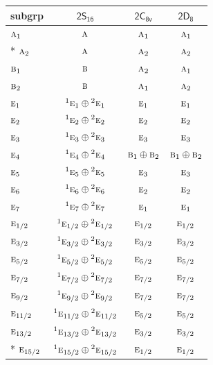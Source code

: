 \documentclass[10pt,a4paper]{article}
\numberwithin{equation}{section}
\newcommand{\grp}[1]{\mathsf{#1}}
\newcommand{\irr}[1]{\text{\normalfont\scshape #1}}
\newcommand{\conjpair}[1]{{}^{#1}}
\begin{document}
{\small\begin{longtable}{@{}lccc@{}}\toprule
subgrp & \href{2S16.pdf}{$\grp{2S_{16}}$} & \href{2C8v.pdf}{$\grp{2C_{8v}}$} & \href{2D8.pdf}{$\grp{2D_{8}}$}\\\midrule\endhead
\bottomrule\endfoot\endlastfoot
$\irr{a}_{1}$ & $\irr{a}$ & $\irr{a}_{1}$ & $\irr{a}_{1}$\\*
$\irr{a}_{2}$ & $\irr{a}$ & $\irr{a}_{2}$ & $\irr{a}_{2}$\\
$\irr{b}_{1}$ & $\irr{b}$ & $\irr{a}_{2}$ & $\irr{a}_{1}$\\
$\irr{b}_{2}$ & $\irr{b}$ & $\irr{a}_{1}$ & $\irr{a}_{2}$\\
$\irr{e}_{1}$ & $\conjpair{1}\irr{e}_{1}\oplus \conjpair{2}\irr{e}_{1}$ & $\irr{e}_{1}$ & $\irr{e}_{1}$\\
$\irr{e}_{2}$ & $\conjpair{1}\irr{e}_{2}\oplus \conjpair{2}\irr{e}_{2}$ & $\irr{e}_{2}$ & $\irr{e}_{2}$\\
$\irr{e}_{3}$ & $\conjpair{1}\irr{e}_{3}\oplus \conjpair{2}\irr{e}_{3}$ & $\irr{e}_{3}$ & $\irr{e}_{3}$\\
$\irr{e}_{4}$ & $\conjpair{1}\irr{e}_{4}\oplus \conjpair{2}\irr{e}_{4}$ & $\irr{b}_{1}\oplus \irr{b}_{2}$ & $\irr{b}_{1}\oplus \irr{b}_{2}$\\
$\irr{e}_{5}$ & $\conjpair{1}\irr{e}_{5}\oplus \conjpair{2}\irr{e}_{5}$ & $\irr{e}_{3}$ & $\irr{e}_{3}$\\
$\irr{e}_{6}$ & $\conjpair{1}\irr{e}_{6}\oplus \conjpair{2}\irr{e}_{6}$ & $\irr{e}_{2}$ & $\irr{e}_{2}$\\
$\irr{e}_{7}$ & $\conjpair{1}\irr{e}_{7}\oplus \conjpair{2}\irr{e}_{7}$ & $\irr{e}_{1}$ & $\irr{e}_{1}$\\
$\irr{e}_{1/2}$ & $\conjpair{1}\irr{e}_{1/2}\oplus \conjpair{2}\irr{e}_{1/2}$ & $\irr{e}_{1/2}$ & $\irr{e}_{1/2}$\\
$\irr{e}_{3/2}$ & $\conjpair{1}\irr{e}_{3/2}\oplus \conjpair{2}\irr{e}_{3/2}$ & $\irr{e}_{3/2}$ & $\irr{e}_{3/2}$\\
$\irr{e}_{5/2}$ & $\conjpair{1}\irr{e}_{5/2}\oplus \conjpair{2}\irr{e}_{5/2}$ & $\irr{e}_{5/2}$ & $\irr{e}_{5/2}$\\
$\irr{e}_{7/2}$ & $\conjpair{1}\irr{e}_{7/2}\oplus \conjpair{2}\irr{e}_{7/2}$ & $\irr{e}_{7/2}$ & $\irr{e}_{7/2}$\\
$\irr{e}_{9/2}$ & $\conjpair{1}\irr{e}_{9/2}\oplus \conjpair{2}\irr{e}_{9/2}$ & $\irr{e}_{7/2}$ & $\irr{e}_{7/2}$\\
$\irr{e}_{11/2}$ & $\conjpair{1}\irr{e}_{11/2}\oplus \conjpair{2}\irr{e}_{11/2}$ & $\irr{e}_{5/2}$ & $\irr{e}_{5/2}$\\
$\irr{e}_{13/2}$ & $\conjpair{1}\irr{e}_{13/2}\oplus \conjpair{2}\irr{e}_{13/2}$ & $\irr{e}_{3/2}$ & $\irr{e}_{3/2}$\\*
$\irr{e}_{15/2}$ & $\conjpair{1}\irr{e}_{15/2}\oplus \conjpair{2}\irr{e}_{15/2}$ & $\irr{e}_{1/2}$ & $\irr{e}_{1/2}$\\
\bottomrule\end{longtable}}
\end{document}
